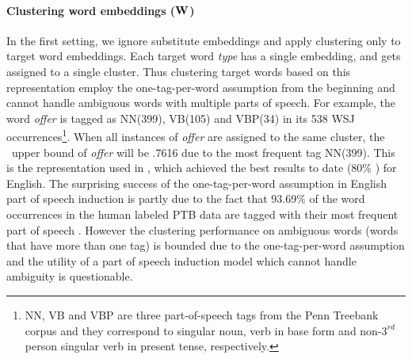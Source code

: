 \paragraph{Clustering word embeddings (${\bf W}$)} In the first setting,
we ignore substitute embeddings and apply clustering only to target
word embeddings.  Each target word {\em type} has a single embedding,
and gets assigned to a single cluster.  Thus clustering target words
based on this representation employ the one-tag-per-word assumption
from the beginning and cannot handle ambiguous words with multiple
parts of speech.  For example, the word {\em offer} is tagged as
NN(399), VB(105) and VBP(34) in its 538 WSJ occurrences\footnote{NN,
  VB and VBP are three part-of-speech tags from the Penn Treebank
  corpus and they correspond to singular noun, verb in base form and
  non-$3^{rd}$person singular verb in present tense, respectively.}.
When all instances of {\em offer} are assigned to the same cluster,
the \mto\ upper bound of {\em offer} will be .7616 due to the most
frequent tag NN(399).  This is the representation used in
\cite{yatbaz-sert-yuret:2012:EMNLP-CoNLL}, which achieved the best
results to date (80\% \mto) for English.  The surprising success of
the one-tag-per-word assumption in English part of speech induction is
partly due to the fact that 93.69\% of the word occurrences in the
human labeled PTB data are tagged with their most frequent part of
speech \cite{Toutanova:2003:FPT:1073445.1073478}.  However the
clustering performance on ambiguous words (words that have more than
one tag) is bounded due to the one-tag-per-word assumption and the
utility of a part of speech induction model which cannot handle
ambiguity is questionable.

